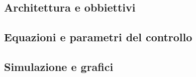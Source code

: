 \subsection{Architettura e obbiettivi}

\subsection{Equazioni e parametri del controllo}

\subsection{Simulazione e grafici}

